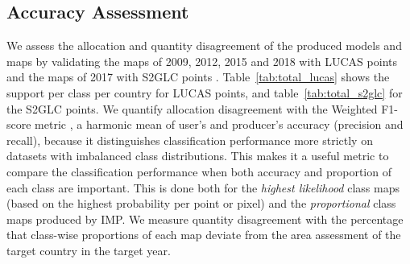     \subsection{Accuracy Assessment}
    
    We assess the allocation and quantity disagreement \citep{pontius2011death} of the produced models and maps by validating the maps of 2009, 2012, 2015 and 2018 with LUCAS points \citep{dandrimont2020harmonised} and the maps of 2017 with S2GLC points \citep{jenerowicz2021validation}. Table~\ref{tab:total_lucas} shows the support per class per country for LUCAS points, and table~\ref{tab:total_s2glc} for the S2GLC points. We quantify allocation disagreement with the Weighted F1-score metric \citep{rijsbergen1980information}, a harmonic mean of user's and producer's accuracy (precision and recall), because it distinguishes classification performance more strictly on datasets with imbalanced class distributions. This makes it a useful metric to compare the classification performance when both accuracy and proportion of each class are important. This is done both for the \textit{highest likelihood} class maps (based on the highest probability per point or pixel) and the \textit{proportional} class maps produced by IMP. We measure quantity disagreement with the percentage that class-wise proportions of each map deviate from the area assessment of the target country in the target year.

    \begin{table}[H]
        \caption{Summary of LUCAS points per country and LUCAS level 1 class, used to validate the land cover maps of 2009, 2012, 2015, and 2018}
        \label{tab:total_lucas}
    \end{table}

